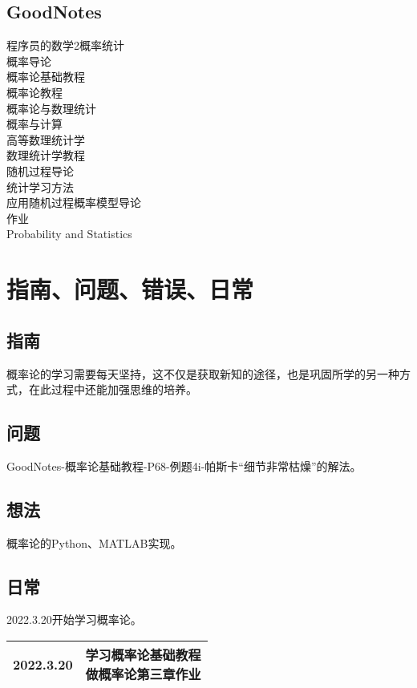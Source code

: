 \documentclass{book}%
\begin{document}
	\section{GoodNotes}
	程序员的数学2概率统计\\
	概率导论\\
	概率论基础教程\\
	概率论教程\\
	概率论与数理统计\\
	概率与计算\\
	高等数理统计学\\
	数理统计学教程\\
	随机过程导论\\
	统计学习方法\\
	应用随机过程概率模型导论\\
	作业\\
	Probability and Statistics\\
	
	\chapter{指南、问题、错误、日常}
	
	\section{指南}
	概率论的学习需要每天坚持，这不仅是获取新知的途径，也是巩固所学的另一种方式，在此过程中还能加强思维的培养。\\
	
	\section{问题}
	GoodNotes-概率论基础教程-P68-例题4i-帕斯卡“细节非常枯燥”的解法。\\
	
	\section{想法}
	概率论的Python、MATLAB实现。\\
	
	\section{日常}
	2022.3.20开始学习概率论。\\
	\begin{table}[h]
		\begin{tabular}{|c|c|}
			\hline
			2022.3.20&\makecell[c]{学习概率论基础教程\\做概率论第三章作业\\}\\
			\hline
		\end{tabular}
	\end{table}
\end{document}

